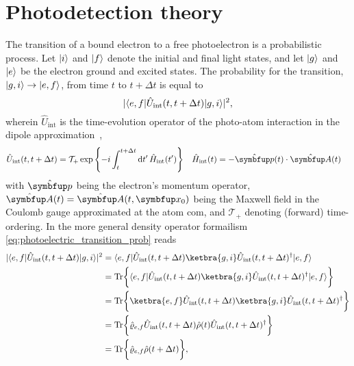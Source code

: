 \chapter{Photodetection theory}\label{app:photodetection_theory}

The transition of a bound electron to a free photoelectron is a probabilistic process.
Let $\lvert i\rangle$ and $\lvert f\rangle$ denote the initial and final light states, and let $\lvert g\rangle$ and $\lvert e\rangle$ be the electron ground and excited states.
The probability for the transition, $\lvert g,i\rangle\to\lvert e,f\rangle$, from time $t$ to $t+\Delta t$ is equal to
\begin{equation}
	\lvert
		\langle e,f\rvert
		\hat{U}_\text{int}(t,t+\Delta t)
		\lvert g,i\rangle
	\rvert^2
	\label{eq:photoelectric_transition_prob}
	,
\end{equation}
wherein $\hat{U}_\text{int}$ is the time-evolution operator of the photo-atom interaction in the dipole approximation~\cite[p.~689]{Mandel1995},
\begin{align}
	\hat{U}_\text{int}(t,t+\Delta t)
	&=
	\mathcal{T}_+
	\exp\left\{
		-i
		\int_t^{t+\Delta t}
		\dd{t^\prime}
		\hat{H}_\text{int}(t^\prime)
	\right\}
	&
	\hat{H}_\text{int}(t)
	&=
	-
	\hat{\vb{p}}(t)
	\vdot
	\hat{\vb{A}}(t)
	\label{eq:photoelectric_time_evolution_operator}
\end{align}
with $\vu{p}$ being the electron's momentum operator, $\vu{A}(t)=\vu{A}(t,\vb{x}_0)$ being the Maxwell field in the Coulomb gauge approximated at the atom \gls{com}, and $\mathcal{T}_+$ denoting (forward) time-ordering.
In the more general density operator formailism \cref{eq:photoelectric_transition_prob} reads~\cite[p.~686]{Mandel1995}
\begin{equation}
	\begin{split}
		\abs{
			\bra{e,f}
			\hat{U}_\text{int}(t,t+\Delta t)
			\ket{g,i}
		}^2
		&=
		\bra{e,f}
		\hat{U}_\text{int}(t,t+\Delta t)
		\ketbra{g,i}
		\hat{U}_\text{int}(t,t+\Delta t)^\dagger
		\ket{e,f}
		\\
		&=
		\trace\biggl\{
			\bra{e,f}
			\hat{U}_\text{int}(t,t+\Delta t)
			\ketbra{g,i}
			\hat{U}_\text{int}(t,t+\Delta t)^\dagger
			\ket{e,f}
		\biggr\}
		\\
		&=
		\trace\biggl\{
			\ketbra{e,f}
			\hat{U}_\text{int}(t,t+\Delta t)
			\ketbra{g,i}
			\hat{U}_\text{int}(t,t+\Delta t)^\dagger
		\biggr\}
		\\
		&=
		\trace\biggl\{
			\hat\varrho_{e,f}
			\hat{U}_\text{int}(t,t+\Delta t)
			\hat\rho(t)
			\hat{U}_\text{int}(t,t+\Delta t)^\dagger
		\biggr\}
		\\
		&=
		\trace\biggl\{
			\hat\varrho_{e,f}
			\hat\rho(t+\Delta t)
		\biggr\}
		,
	\end{split}
	\label{eq:photoelectric_transition_prob_density}
\end{equation}
